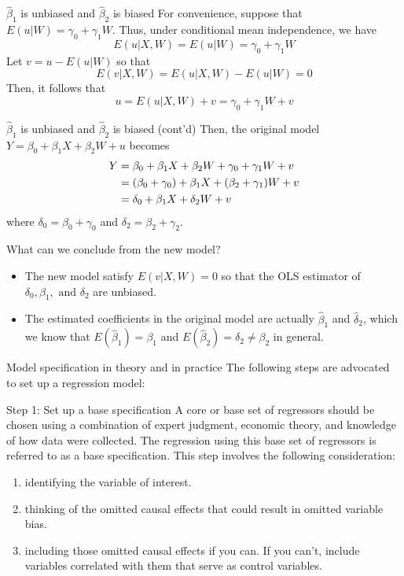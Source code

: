 \documentclass[presentation,10pt]{beamer}
\begin{document}
\begin{frame}[label={sec:org323e17e}]{\(\hat{\beta}_1\) is unbiased and \(\hat{\beta}_2\) is biased}
For convenience, suppose that \(E(u|W) = \gamma_0 + \gamma_1 W\). Thus,
under conditional mean independence, we have
\[ E(u|X,W) = E(u|W) = \gamma_0 + \gamma_1 W \]
Let \(v = u - E(u|W)\) so that
\[E(v|X, W) = E(u|X,W) - E(u|W) = 0 \]
Then, it follows that
\[ u = E(u|X,W) + v = \gamma_0 + \gamma_1 W + v \]
\end{frame}

\begin{frame}[label={sec:org27ce9e0}]{\(\hat{\beta}_1\) is unbiased and \(\hat{\beta}_2\) is biased (cont'd)}
Then, the original model \(Y = \beta_0 + \beta_1 X + \beta_2 W + u\)
becomes
\begin{equation}
\begin{split}
Y &= \beta_0 + \beta_1 X + \beta_2 W + \gamma_0 + \gamma_1 W + v \notag \\
&= (\beta_0 + \gamma_0) + \beta_1 X + (\beta_2 + \gamma_1) W + v \notag \\
&= \delta_0 + \beta_1 X + \delta_2 W + v
\end{split}
\end{equation}
where \(\delta_0 = \beta_0 + \gamma_0\) and \(\delta_2 = \beta_2 +
\gamma_2\).

What can we conclude from the new model?
\begin{itemize}
\item The new model satisfy \(E(v|X,W) = 0\) so that the OLS estimator of
\(\delta_0, \beta_1, \text{ and } \delta_2\) are unbiased.
\item The estimated coefficients in the original model are actually
\(\hat{\beta}_1\) and \(\hat{\delta}_2\), which we know that
\(E(\hat{\beta}_1) = \beta_1\) and \(E(\hat{\beta}_2) = \delta_2 \neq
  \beta_2\) in general.
\end{itemize}
\end{frame}

\begin{frame}[label={sec:org21da272}]{Model specification in theory and in practice}
The following steps are advocated to set up a regression model:

\begin{block}{Step 1: Set up a base specification}
A core or base set of regressors should be chosen using a
combination of expert judgment, economic theory, and knowledge of
how data were collected. The regression using this base set of
regressors is referred to as a \alert{base specification}. This step
involves the following consideration:
\begin{enumerate}
\item identifying the variable of interest.
\item thinking of the omitted causal effects that could result in omitted
variable bias.
\item including those omitted causal effects if you can. If you
can’t, include variables correlated with them that serve as
control variables.
\end{enumerate}
\end{block}
\end{frame}
\end{document}
